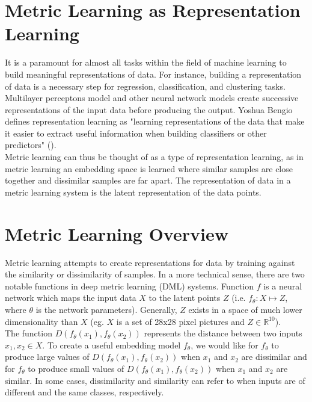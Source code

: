 \documentclass[./dissertation.tex]{subfiles}
\begin{document}
    
    \section{Metric Learning as Representation Learning}
    It is a paramount for almost all tasks within the field of machine learning to build meaningful representations of data. For instance, building a representation of data is a necessary step for regression, classification, and clustering tasks. Multilayer perceptons model and other neural network models create successive representations of the input data before producing the output. Yoshua Bengio defines representation learning as "learning representations of the data that make it easier to extract useful information when building classifiers or other predictors" (\cite{bengio2013representation}).\\
    
    Metric learning can thus be thought of as a type of representation learning, as in metric learning an embedding space is learned where similar samples are close together and dissimilar samples are far apart. The representation of data in a metric learning system is the latent representation of the data points. 
    \section{Metric Learning Overview}
    Metric learning attempts to create representations for data by training against the similarity or dissimilarity of samples. In a more technical sense, there are two notable functions in deep metric learning (DML) systems. Function $f$ is a neural network which maps the input data $X$ to the latent points $Z$ (i.e. $f_{\theta}: X \mapsto Z$, where $\theta$ is the network parameters). Generally, $Z$ exists in a space of much lower dimensionality than $X$ (eg. $X$ is a set of 28x28 pixel pictures and $Z \in \mathbb{R}^{10}$).\\
    
    The function $D(f_{\theta}(x_{1}), f_{\theta}(x_{2}))$ represents the distance between two inputs $x_{1}, x_{2} \in X$. To create a useful embedding model $f_{\theta}$, we would like for $f_{\theta}$ to produce large values of $D(f_{\theta}(x_{1}), f_{\theta}(x_{2}))$ when $x_{1}$ and $x_{2}$ are dissimilar and for $f_{\theta}$ to produce small values of $D(f_{\theta}(x_{1}), f_{\theta}(x_{2}))$ when $x_{1}$ and $x_{2}$ are similar. In some cases, dissimilarity and similarity can refer to when inputs are of different and the same classes, respectively. \\
    
\end{document}
